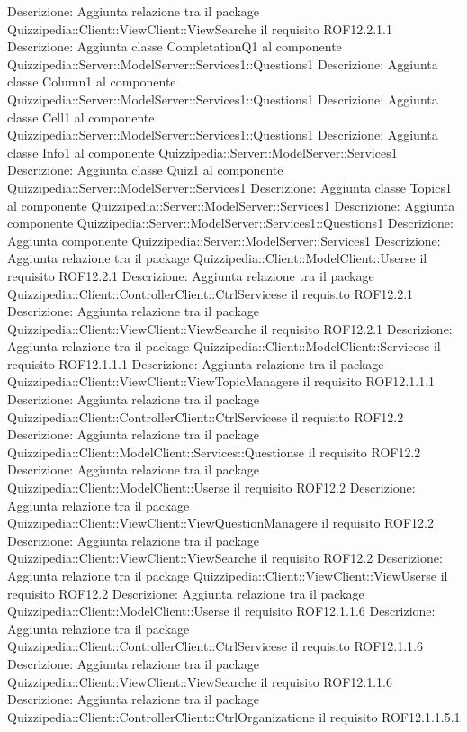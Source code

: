 Descrizione: Aggiunta relazione tra il package Quizzipedia::Client::ViewClient::ViewSearche il requisito ROF12.2.1.1 
Descrizione: Aggiunta classe CompletationQ1 al componente Quizzipedia::Server::ModelServer::Services1::Questions1 
Descrizione: Aggiunta classe Column1 al componente Quizzipedia::Server::ModelServer::Services1::Questions1 
Descrizione: Aggiunta classe Cell1 al componente Quizzipedia::Server::ModelServer::Services1::Questions1 
Descrizione: Aggiunta classe Info1 al componente Quizzipedia::Server::ModelServer::Services1 
Descrizione: Aggiunta classe Quiz1 al componente Quizzipedia::Server::ModelServer::Services1 
Descrizione: Aggiunta classe Topics1 al componente Quizzipedia::Server::ModelServer::Services1 
Descrizione: Aggiunta componente Quizzipedia::Server::ModelServer::Services1::Questions1 
Descrizione: Aggiunta componente Quizzipedia::Server::ModelServer::Services1 
Descrizione: Aggiunta relazione tra il package Quizzipedia::Client::ModelClient::Userse il requisito ROF12.2.1 
Descrizione: Aggiunta relazione tra il package Quizzipedia::Client::ControllerClient::CtrlServicese il requisito ROF12.2.1 
Descrizione: Aggiunta relazione tra il package Quizzipedia::Client::ViewClient::ViewSearche il requisito ROF12.2.1 
Descrizione: Aggiunta relazione tra il package Quizzipedia::Client::ModelClient::Servicese il requisito ROF12.1.1.1 
Descrizione: Aggiunta relazione tra il package Quizzipedia::Client::ViewClient::ViewTopicManagere il requisito ROF12.1.1.1 
Descrizione: Aggiunta relazione tra il package Quizzipedia::Client::ControllerClient::CtrlServicese il requisito ROF12.2 
Descrizione: Aggiunta relazione tra il package Quizzipedia::Client::ModelClient::Services::Questionse il requisito ROF12.2 
Descrizione: Aggiunta relazione tra il package Quizzipedia::Client::ModelClient::Userse il requisito ROF12.2 
Descrizione: Aggiunta relazione tra il package Quizzipedia::Client::ViewClient::ViewQuestionManagere il requisito ROF12.2 
Descrizione: Aggiunta relazione tra il package Quizzipedia::Client::ViewClient::ViewSearche il requisito ROF12.2 
Descrizione: Aggiunta relazione tra il package Quizzipedia::Client::ViewClient::ViewUserse il requisito ROF12.2 
Descrizione: Aggiunta relazione tra il package Quizzipedia::Client::ModelClient::Userse il requisito ROF12.1.1.6 
Descrizione: Aggiunta relazione tra il package Quizzipedia::Client::ControllerClient::CtrlServicese il requisito ROF12.1.1.6 
Descrizione: Aggiunta relazione tra il package Quizzipedia::Client::ViewClient::ViewSearche il requisito ROF12.1.1.6 
Descrizione: Aggiunta relazione tra il package Quizzipedia::Client::ControllerClient::CtrlOrganizatione il requisito ROF12.1.1.5.1 
